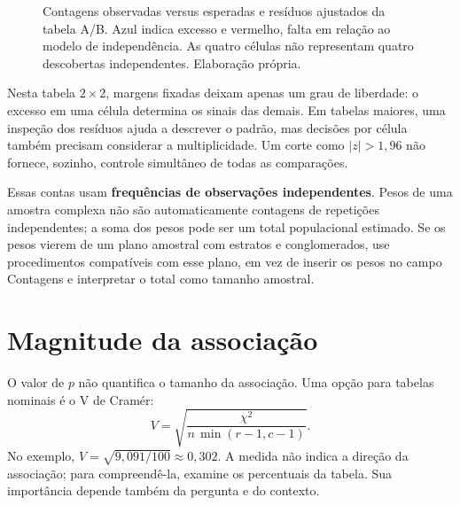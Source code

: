 \begin{figure}[H]
\centering
{}
\caption{Contagens observadas versus esperadas e resíduos ajustados da tabela A/B. Azul indica excesso e vermelho, falta em relação ao modelo de independência. As quatro células não representam quatro descobertas independentes. Elaboração própria.}
\label{fig:residuos-contingencia}
\end{figure}

Nesta tabela $2\times2$, margens fixadas deixam apenas um grau de liberdade: o excesso em uma célula determina os sinais das demais. Em tabelas maiores, uma inspeção dos resíduos ajuda a descrever o padrão, mas decisões por célula também precisam considerar a multiplicidade. Um corte como $|z|>1{,}96$ não fornece, sozinho, controle simultâneo de todas as comparações.

Essas contas usam \textbf{frequências de observações independentes}. Pesos de uma amostra complexa não são automaticamente contagens de repetições independentes; a soma dos pesos pode ser um total populacional estimado. Se os pesos vierem de um plano amostral com estratos e conglomerados, use procedimentos compatíveis com esse plano, em vez de inserir os pesos no campo Contagens e interpretar o total como tamanho amostral.

\section{Magnitude da associação}

O valor de $p$ não quantifica o tamanho da associação. Uma opção para tabelas nominais é o V de Cramér:
\[
V=\sqrt{\frac{\chi^2}{n\,\min(r-1,c-1)}}.
\]
No exemplo, $V=\sqrt{9{,}091/100}\approx0{,}302$. A medida não indica a direção da associação; para compreendê-la, examine os percentuais da tabela. Sua importância depende também da pergunta e do contexto.

